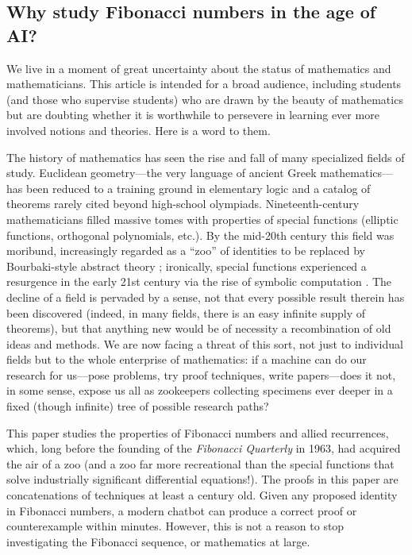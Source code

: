 \documentclass{article}
\numberwithin{equation}{section}
\theoremstyle{definition}
\theoremstyle{remark}
\newcommand{\<}{\left\langle}
\renewcommand{\>}{\right\rangle}
\begin{document}
\subsection{Why study Fibonacci numbers in the age of AI?}

We live in a moment of great uncertainty about the status of mathematics and mathematicians. This article is intended for a broad audience, including students (and those who supervise students) who are drawn by the beauty of mathematics but are doubting whether it is worthwhile to persevere in learning ever more involved notions and theories. Here is a word to them.

The history of mathematics has seen the rise and fall of many specialized fields of study. Euclidean geometry---the very language of ancient Greek mathematics---has been reduced to a training ground in elementary logic and a catalog of theorems rarely cited beyond high-school olympiads. Nineteenth-century mathematicians filled massive tomes with properties of special functions (elliptic functions, orthogonal polynomials, etc.). By the mid-20th century this field was moribund, increasingly regarded as a ``zoo'' of identities to be replaced by Bourbaki-style abstract theory \cite{Beals2012PDE};  ironically, special functions experienced a resurgence in the early 21st century via the rise of symbolic computation \cite{Wolfram2005SpecialFunctions}.
The decline of a field is pervaded by a sense, not that every possible result therein has been discovered (indeed, in many fields, there is an easy infinite supply of theorems), but that anything new would be of necessity a recombination of old ideas and methods. We are now facing a threat of this sort, not just to individual fields but to the whole enterprise of mathematics: if a machine can do our research for us---pose problems, try proof techniques, write papers---does it not, in some sense, expose us all as zookeepers collecting specimens ever deeper in a fixed (though infinite) tree of possible research paths?

This paper studies the properties of Fibonacci numbers and allied recurrences, which, long before the founding of the \emph{Fibonacci Quarterly} in 1963, had acquired the air of a zoo (and a zoo far more recreational than the special functions that solve industrially significant differential equations!). The proofs in this paper are concatenations of techniques at least a century old. Given any proposed identity in Fibonacci numbers, a modern chatbot can produce a correct proof or counterexample within minutes. However, this is not a reason to stop investigating the Fibonacci sequence, or mathematics at large.
\end{document}

